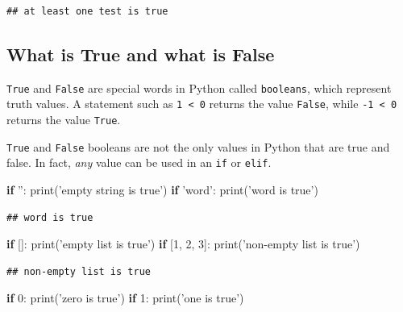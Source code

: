 \documentclass[]{book}
\newenvironment{Shaded}{\begin{snugshade}}{\end{snugshade}}
\newcommand{\BuiltInTok}[1]{#1}
\newcommand{\ControlFlowTok}[1]{\textcolor[rgb]{0.13,0.29,0.53}{\textbf{#1}}}
\newcommand{\DecValTok}[1]{\textcolor[rgb]{0.00,0.00,0.81}{#1}}
\newcommand{\NormalTok}[1]{#1}
\newcommand{\StringTok}[1]{\textcolor[rgb]{0.31,0.60,0.02}{#1}}
\theoremstyle{definition}
\theoremstyle{definition}
\theoremstyle{definition}
\theoremstyle{remark}
\begin{document}
\begin{verbatim}
## at least one test is true
\end{verbatim}

\hypertarget{what-is-true-and-what-is-false}{%
\subsection{What is True and what is
False}\label{what-is-true-and-what-is-false}}

\texttt{True} and \texttt{False} are special words in Python called
\texttt{booleans}, which represent truth values. A statement such as
\texttt{1\ \textless{}\ 0} returns the value \texttt{False}, while
\texttt{-1\ \textless{}\ 0} returns the value \texttt{True}.

\texttt{True} and \texttt{False} booleans are not the only values in
Python that are true and false. In fact, \emph{any} value can be used in
an \texttt{if} or \texttt{elif}.

\begin{Shaded}
\begin{Highlighting}[]
\ControlFlowTok{if} \StringTok{''}\NormalTok{:}
    \BuiltInTok{print}\NormalTok{(}\StringTok{'empty string is true'}\NormalTok{)}
\ControlFlowTok{if} \StringTok{'word'}\NormalTok{:}
    \BuiltInTok{print}\NormalTok{(}\StringTok{'word is true'}\NormalTok{)}
\end{Highlighting}
\end{Shaded}

\begin{verbatim}
## word is true
\end{verbatim}

\begin{Shaded}
\begin{Highlighting}[]
\ControlFlowTok{if}\NormalTok{ []:}
    \BuiltInTok{print}\NormalTok{(}\StringTok{'empty list is true'}\NormalTok{)}
\ControlFlowTok{if}\NormalTok{ [}\DecValTok{1}\NormalTok{, }\DecValTok{2}\NormalTok{, }\DecValTok{3}\NormalTok{]:}
    \BuiltInTok{print}\NormalTok{(}\StringTok{'non-empty list is true'}\NormalTok{)}
\end{Highlighting}
\end{Shaded}

\begin{verbatim}
## non-empty list is true
\end{verbatim}

\begin{Shaded}
\begin{Highlighting}[]
\ControlFlowTok{if} \DecValTok{0}\NormalTok{:}
     \BuiltInTok{print}\NormalTok{(}\StringTok{'zero is true'}\NormalTok{)}
\ControlFlowTok{if} \DecValTok{1}\NormalTok{:}
    \BuiltInTok{print}\NormalTok{(}\StringTok{'one is true'}\NormalTok{)}
\end{Highlighting}
\end{Shaded}
\end{document}
